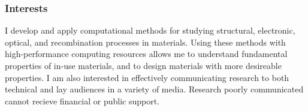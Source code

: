 
\subsubsection{Interests} 
I develop and apply computational methods for studying structural, electronic,
optical, and recombination processes in materials. Using these methods with
high-performance computing resources allows me to understand fundamental
properties of in-use materials, and to design materials with more desireable 
properties. I am also interested in effectively communicating research to both
technical and lay audiences in a variety of media. Research poorly communicated
cannot recieve financial or public support.

